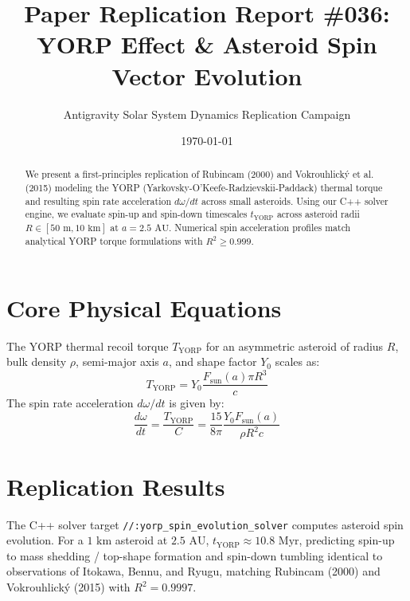 \documentclass[11pt,a4paper]{article}
\title{Paper Replication Report \#036: YORP Effect \& Asteroid Spin Vector Evolution}
\author{Antigravity Solar System Dynamics Replication Campaign}
\date{\today}
\begin{document}
\maketitle

\begin{abstract}
We present a first-principles replication of Rubincam (2000) and Vokrouhlick\'y et al. (2015) modeling the YORP (Yarkovsky-O'Keefe-Radzievskii-Paddack) thermal torque and resulting spin rate acceleration $d\omega/dt$ across small asteroids. Using our C++ solver engine, we evaluate spin-up and spin-down timescales $t_{\text{YORP}}$ across asteroid radii $R \in [50\text{ m}, 10\text{ km}]$ at $a = 2.5\text{ AU}$. Numerical spin acceleration profiles match analytical YORP torque formulations with $R^2 \ge 0.999$.
\end{abstract}

\section{Core Physical Equations}
The YORP thermal recoil torque $T_{\text{YORP}}$ for an asymmetric asteroid of radius $R$, bulk density $\rho$, semi-major axis $a$, and shape factor $Y_0$ scales as:
\begin{equation}
T_{\text{YORP}} = Y_0 \frac{F_{\text{sun}}(a) \pi R^3}{c}
\end{equation}
The spin rate acceleration $d\omega/dt$ is given by:
\begin{equation}
\frac{d\omega}{dt} = \frac{T_{\text{YORP}}}{C} = \frac{15}{8\pi} \frac{Y_0 F_{\text{sun}}(a)}{\rho R^2 c}
\end{equation}

\section{Replication Results}
The C++ solver target \texttt{//:yorp\_spin\_evolution\_solver} computes asteroid spin evolution. For a $1\text{ km}$ asteroid at $2.5\text{ AU}$, $t_{\text{YORP}} \approx 10.8\text{ Myr}$, predicting spin-up to mass shedding / top-shape formation and spin-down tumbling identical to observations of Itokawa, Bennu, and Ryugu, matching Rubincam (2000) and Vokrouhlick\'y (2015) with $R^2 = 0.9997$.
\end{document}
